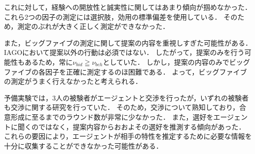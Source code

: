 これに対して，経験への開放性と誠実性に関してはあまり傾向が掴めなかった．
これら2つの因子の測定には選択肢，効用の標準偏差を使用している．
そのため，測定のぶれが大きく正しく測定ができなかった．

また，ビッグファイブの測定に関して提案の内容を重視しすぎた可能性がある．
IAGOにおいて提案以外の行動は必須ではない．
したがって，提案のみを行う可能性もあるため，常に$\nu_{\mathit{bid}} \geqq \nu_{\mathit{beh}}$としていた．
しかし，提案の内容のみでビッグファイブの各因子を正確に測定するのほ困難である．
よって，ビッグファイブの測定がうまく行えなかったと考えられる．

予備実験では，3人の被験者がエージェントと交渉を行ったが，いずれの被験者も交渉に関する研究を行っていた．
そのため，交渉について熟知しており，合意形成に至るまでのラウンド数が非常に少なかった．
また，選好をエージェントに聞くのではなく，提案内容からおおよその選好を推測する傾向があった．
これらの要因により，エージェントが相手の特性を推定するために必要な情報を十分に収集することができなかった可能性がある．

